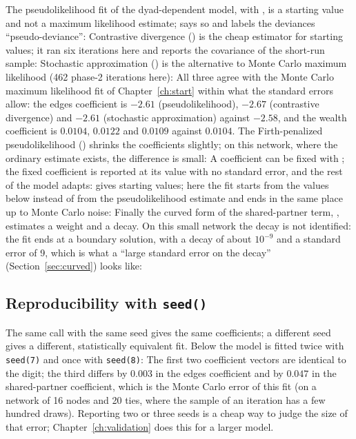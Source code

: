 The pseudolikelihood fit of the dyad-dependent model, with , is a starting value and not a maximum likelihood estimate; \nwergm{} says so and labels the deviances ``pseudo-deviance'':
Contrastive divergence () is the cheap estimator for starting values; it ran six iterations here and reports the covariance of the short-run sample:
Stochastic approximation () is the alternative to Monte Carlo maximum likelihood (462 phase-2 iterations here):
All three agree with the Monte Carlo maximum likelihood fit of Chapter~\ref{ch:start} within what the standard errors allow: the edges coefficient is $-2.61$ (pseudolikelihood), $-2.67$ (contrastive divergence) and $-2.61$ (stochastic approximation) against $-2.58$, and the wealth coefficient is $0.0104$, $0.0122$ and $0.0109$ against $0.0104$. The Firth-penalized pseudolikelihood () shrinks the coefficients slightly; on this network, where the ordinary estimate exists, the difference is small:
A coefficient can be fixed with ; the fixed coefficient is reported at its value with no standard error, and the rest of the model adapts:
 gives starting values; here the fit starts from the values below instead of from the pseudolikelihood estimate and ends in the same place up to Monte Carlo noise:
Finally the curved form of the shared-partner term, , estimates a weight and a decay. On this small network the decay is not identified: the fit ends at a boundary solution, with a decay of about $10^{-9}$ and a standard error of 9, which is what a ``large standard error on the decay'' (Section~\ref{sec:curved}) looks like:

\subsection{Reproducibility with \texttt{seed()}}\label{sec:flo_seed}

The same call with the same seed gives the same coefficients; a different seed gives a different, statistically equivalent fit. Below the model is fitted twice with \texttt{seed(7)} and once with \texttt{seed(8)}:
The first two coefficient vectors are identical to the digit; the third differs by $0.003$ in the edges coefficient and by $0.047$ in the shared-partner coefficient, which is the Monte Carlo error of this fit (on a network of 16 nodes and 20 ties, where the sample of an iteration has a few hundred draws). Reporting two or three seeds is a cheap way to judge the size of that error; Chapter~\ref{ch:validation} does this for a larger model.

